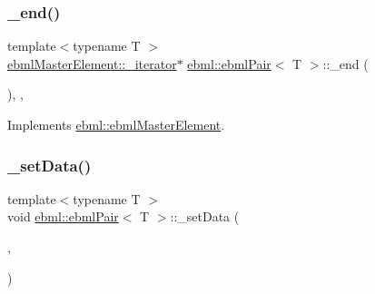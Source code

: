 \mbox{\label{classebml_1_1ebmlPair_aa9885eed27f8a81efe246b5a6755186b}} 
\subsubsection{\texorpdfstring{\+\_\+end()}{\_end()}}
{\footnotesize\ttfamily template$<$typename T $>$ \\
\mbox{\hyperlink{classebml_1_1ebmlMasterElement_1_1__iterator}{ebml\+Master\+Element\+::\+\_\+iterator}}$\ast$ \mbox{\hyperlink{classebml_1_1ebmlPair}{ebml\+::ebml\+Pair}}$<$ T $>$\+::\+\_\+end (\begin{DoxyParamCaption}{ }\end{DoxyParamCaption})\hspace{0.3cm}{\ttfamily [override]}, {\ttfamily [protected]}, {\ttfamily [virtual]}}



Implements \mbox{\hyperlink{classebml_1_1ebmlMasterElement_a352e5e11836063394990cb05c09d8e48}{ebml\+::ebml\+Master\+Element}}.

\mbox{\label{classebml_1_1ebmlPair_a43ae0c4a471cba5b3c83133951b773ba}} 
\subsubsection{\texorpdfstring{\+\_\+set\+Data()}{\_setData()}\hspace{0.1cm}{\footnotesize\ttfamily [1/5]}}
{\footnotesize\ttfamily template$<$typename T $>$ \\
void \mbox{\hyperlink{classebml_1_1ebmlPair}{ebml\+::ebml\+Pair}}$<$ T $>$\+::\+\_\+set\+Data (\begin{DoxyParamCaption}\item[{const \mbox{\hyperlink{namespaceebml_adad533b7705a16bb360fe56380c5e7be}{ebml\+Element\+\_\+sp}} \&}]{,  }\item[{const \mbox{\hyperlink{namespaceebml_adad533b7705a16bb360fe56380c5e7be}{ebml\+Element\+\_\+sp}} \&}]{ }\end{DoxyParamCaption})\hspace{0.3cm}{\ttfamily [protected]}}


